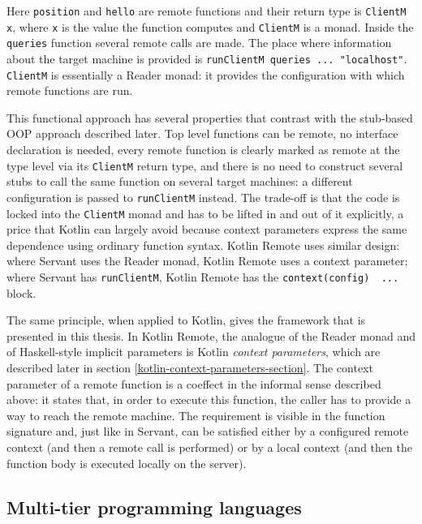 \documentclass[a4paper,11pt,oneside]{article}
\newcommand{\term}[1]{\textit{#1}}
\newcommand{\kotlini}[1]{\texttt{#1}}
\begin{document}
Here \texttt{position} and \texttt{hello} are remote functions and their
return type is \texttt{ClientM x}, where \texttt{x} is the value the
function computes and \texttt{ClientM} is a monad. Inside the
\texttt{queries} function several remote calls are made. The place where information
about the target machine is provided is \texttt{runClientM queries ... "localhost"}.
\texttt{ClientM} is essentially a Reader monad: it provides the configuration with
which remote functions are run.

This functional approach has several properties that contrast with the stub-based OOP approach
described later. Top level functions can be remote, no interface declaration is needed, every
remote function is clearly marked as remote at the type level via its
\texttt{ClientM} return type, and there is no need to construct several stubs to
call the same function on several target machines: a different configuration is passed to
\texttt{runClientM} instead. The trade-off is that the code is locked into the
\texttt{ClientM} monad and has to be lifted in and out of it explicitly, a price
that Kotlin can largely avoid because context parameters express the same dependence using
ordinary function syntax. Kotlin Remote uses similar design: where Servant uses the Reader monad,
Kotlin Remote uses a context parameter; where Servant has \texttt{runClientM}, Kotlin
Remote has the \kotlini{context(config) { ... }} block.

The same principle, when applied to Kotlin, gives the framework that is presented in this thesis.
In Kotlin Remote, the analogue of the Reader monad and of Haskell-style implicit parameters is
Kotlin \term{context parameters}, which are described later in section
\ref{kotlin-context-parameters-section}. The context parameter of a remote function is a coeffect
in the informal sense described above: it states that, in order to execute this function, the
caller has to provide a way to reach the remote machine. The requirement is visible in the
function signature and, just like in Servant, can be satisfied either by a configured remote
context (and then a remote call is performed) or by a local context (and then the function body
is executed locally on the server).

\subsection{Multi-tier programming languages}\label{multi-tier-section}
\end{document}
